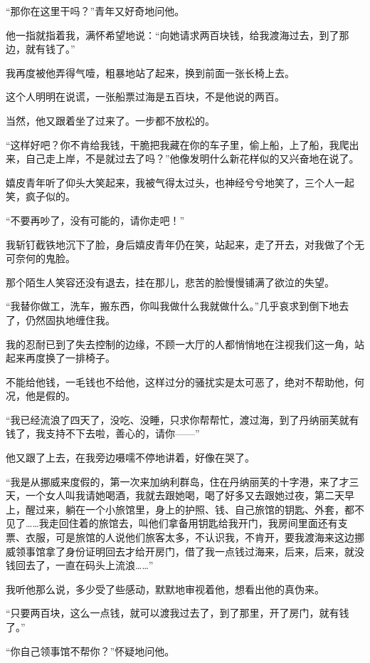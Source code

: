 \par “那你在这里干吗？”青年又好奇地问他。
\par 他一指就指着我，满怀希望地说：“向她请求两百块钱，给我渡海过去，到了那边，就有钱了。”
\par 我再度被他弄得气噎，粗暴地站了起来，换到前面一张长椅上去。
\par 这个人明明在说谎，一张船票过海是五百块，不是他说的两百。
\par 当然，他又跟着坐了过来了。一步都不放松的。
\par “这样好吧？你不肯给我钱，干脆把我藏在你的车子里，偷上船，上了船，我爬出来，自己走上岸，不是就过去了吗？”他像发明什么新花样似的又兴奋地在说了。
\par 嬉皮青年听了仰头大笑起来，我被气得太过头，也神经兮兮地笑了，三个人一起笑，疯子似的。
\par “不要再吵了，没有可能的，请你走吧！”
\par 我斩钉截铁地沉下了脸，身后嬉皮青年仍在笑，站起来，走了开去，对我做了个无可奈何的鬼脸。
\par 那个陌生人笑容还没有退去，挂在那儿，悲苦的脸慢慢铺满了欲泣的失望。
\par “我替你做工，洗车，搬东西，你叫我做什么我就做什么。”几乎哀求到倒下地去了，仍然固执地缠住我。
\par 我的忍耐已到了失去控制的边缘，不顾一大厅的人都悄悄地在注视我们这一角，站起来再度换了一排椅子。
\par 不能给他钱，一毛钱也不给他，这样过分的骚扰实是太可恶了，绝对不帮助他，何况，他是假的。
\par “我已经流浪了四天了，没吃、没睡，只求你帮帮忙，渡过海，到了丹纳丽芙就有钱了，我支持不下去啦，善心的，请你——”
\par 他又跟了上去，在我旁边嗫嚅不停地讲着，好像在哭了。
\par “我是从挪威来度假的，第一次来加纳利群岛，住在丹纳丽芙的十字港，来了才三天，一个女人叫我请她喝酒，我就去跟她喝，喝了好多又去跟她过夜，第二天早上，醒过来，躺在一个小旅馆里，身上的护照、钱、自己旅馆的钥匙、外套，都不见了……我走回住着的旅馆去，叫他们拿备用钥匙给我开门，我房间里面还有支票、衣服，可是旅馆的人说他们旅客太多，不认识我，不肯开，要我渡海来这边挪威领事馆拿了身份证明回去才给开房门，借了我一点钱过海来，后来，后来，就没钱回去了，一直在码头上流浪……”
\par 我听他那么说，多少受了些感动，默默地审视着他，想看出他的真伪来。
\par “只要两百块，这么一点钱，就可以渡我过去了，到了那里，开了房门，就有钱了。”
\par “你自己领事馆不帮你？”怀疑地问他。

